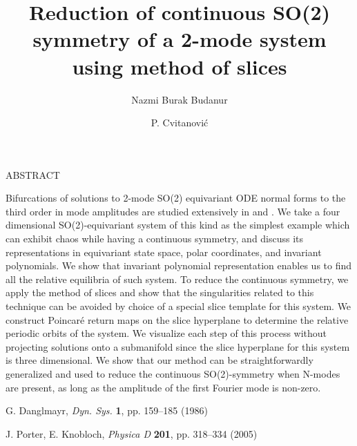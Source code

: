 \documentclass[11pt]{article}
\title{Reduction of continuous SO(2) symmetry of a 2-mode system using method of slices}
\date{}
\author[1]{Nazmi Burak Budanur}
\author[1]{P. Cvitanovi\'{c}}
\affil[1]{School of Physics and Center for Nonlinear Dynamics,
		  Georgia Inst. of Technology,
		  Atlanta, GA  30332, USA \emailaddress{budanur3@gatech.edu}}
\newcommand{\smalllineskip}{\baselineskip=15pt}
\renewenvironment{abstract}[0]{\small\rm
        \begin{center}ABSTRACT
        \\ \vspace{8pt}
        \begin{minipage}{5.2in}\smalllineskip
        \hspace{1pc}}{\end{minipage}\end{center}\vspace{-1pt}}
\begin{document}
\maketitle

\begin{abstract}

Bifurcations of solutions to 2-mode SO(2) equivariant ODE normal forms to 
the third order in mode amplitudes are studied extensively in \cite{Dang86} 
and \cite{PoKno05}. We take a four dimensional SO(2)-equivariant system of 
this kind as the simplest example which can exhibit chaos while having a continuous 
symmetry, and discuss its representations in equivariant state space, polar
coordinates, and invariant polynomials. We show that invariant polynomial 
representation enables us to find all the relative equilibria of such system. 
To reduce the continuous symmetry, we apply the method of slices and show that 
the singularities related to this technique can be avoided by choice of a 
special slice template for this system. We construct Poincar\'e return maps 
on the slice hyperplane to determine the relative periodic orbits of the 
system. We visualize each step of this process without projecting solutions
onto a submanifold since the slice hyperplane for this system is three dimensional.
We show that our method can be straightforwardly generalized and used to reduce 
the continuous SO(2)-symmetry when N-modes are present, as long as the amplitude 
of the first Fourier mode is non-zero. 

\end{abstract}

\begin{thebibliography}{99}
\small

 G. Danglmayr,  {\it Dyn. Sys.} {\bf 1}, pp. 159--185 (1986)

 J. Porter, E. Knobloch, {\it Physica D} {\bf 201}, pp. 318--334 (2005)


\end{thebibliography}
\end{document}
